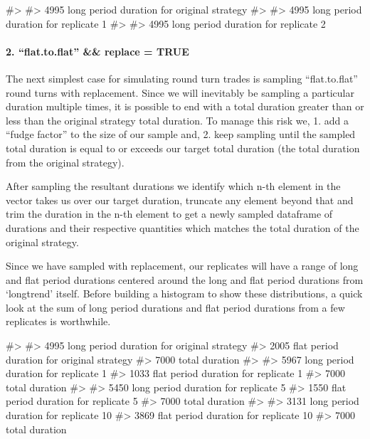 \begin{Schunk}
\begin{Soutput}
#> 
#>  4995 long period duration for original strategy 
#>  
#>  4995 long period duration for replicate 1 
#>  
#>  4995 long period duration for replicate 2
\end{Soutput}
\end{Schunk}

\hypertarget{flat.to.flat-replace-true}{%
\paragraph{2. ``flat.to.flat'' \&\& replace =
TRUE}\label{flat.to.flat-replace-true}}

The next simplest case for simulating round turn trades is sampling
``flat.to.flat'' round turns with replacement. Since we will inevitably
be sampling a particular duration multiple times, it is possible to end
with a total duration greater than or less than the original strategy
total duration. To manage this risk we, 1. add a ``fudge factor'' to the
size of our sample and, 2. keep sampling until the sampled total
duration is equal to or exceeds our target total duration (the total
duration from the original strategy).

After sampling the resultant durations we identify which n-th element in
the vector takes us over our target duration, truncate any element
beyond that and trim the duration in the n-th element to get a newly
sampled dataframe of durations and their respective quantities which
matches the total duration of the original strategy.

Since we have sampled with replacement, our replicates will have a range
of long and flat period durations centered around the long and flat
period durations from `longtrend' itself. Before building a histogram to
show these distributions, a quick look at the sum of long period
durations and flat period durations from a few replicates is worthwhile.

\begin{Schunk}
\begin{Soutput}
#> 
#>  4995 long period duration for original strategy 
#>  2005 flat period duration for original strategy 
#>  7000 total duration 
#>  
#>  5967 long period duration for replicate 1 
#>  1033 flat period duration for replicate 1 
#>  7000 total duration 
#>  
#>  5450 long period duration for replicate 5 
#>  1550 flat period duration for replicate 5 
#>  7000 total duration 
#>  
#>  3131 long period duration for replicate 10 
#>  3869 flat period duration for replicate 10 
#>  7000 total duration
\end{Soutput}
\end{Schunk}


